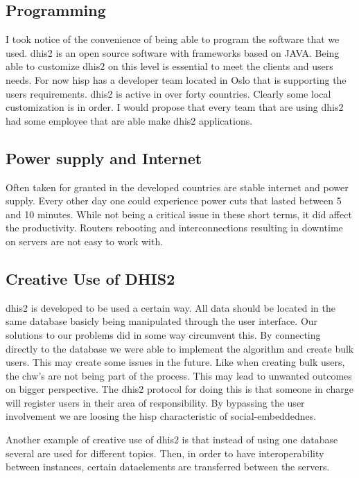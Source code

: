 \subsection{Programming}
I took notice of the convenience of being able to program the software that we used.
\gls{dhis2} is an open source software with frameworks based on JAVA. 
Being able to customize \gls{dhis2} on this level is essential to meet the clients and users needs.
For now \gls{hisp} has a developer team located in Oslo that is supporting the users requirements.
\gls{dhis2} is active in over forty countries. 
Clearly some local customization is in order. 
I would propose that every team that are using \gls{dhis2} had some employee that are able make  \gls{dhis2} applications. 

\subsection{Power supply and Internet}
Often taken for granted in the developed countries are stable internet and power supply.
Every other day one could experience power cuts that lasted between 5 and  10 minutes.
While not being a critical issue in these short terms, it did affect the productivity. 
Routers rebooting and interconnections resulting in downtime on servers are not easy to work with.


\subsection{Creative Use of DHIS2}
\gls{dhis2} is developed to be used a certain way. All data should be located in the same database basicly being manipulated through the user interface.
Our solutions to our problems did in some way circumvent this.
By connecting directly to the database we were able to implement the algorithm and create bulk users.
This may create some issues in the future. 
Like when creating bulk users, the \gls{chw}'s are not being part of the process. 
This may lead to unwanted outcomes on bigger perspective. 
The \gls{dhis2} protocol for doing this is that someone in charge will register users in their area of responsibility.
By bypassing the user involvement we are loosing the \gls{hisp} characteristic of social-embeddednes. 


Another example of creative use of \gls{dhis2} is that instead of using one database several are used for different topics. Then, in order to have interoperability between instances, certain dataelements are transferred between the servers. 

